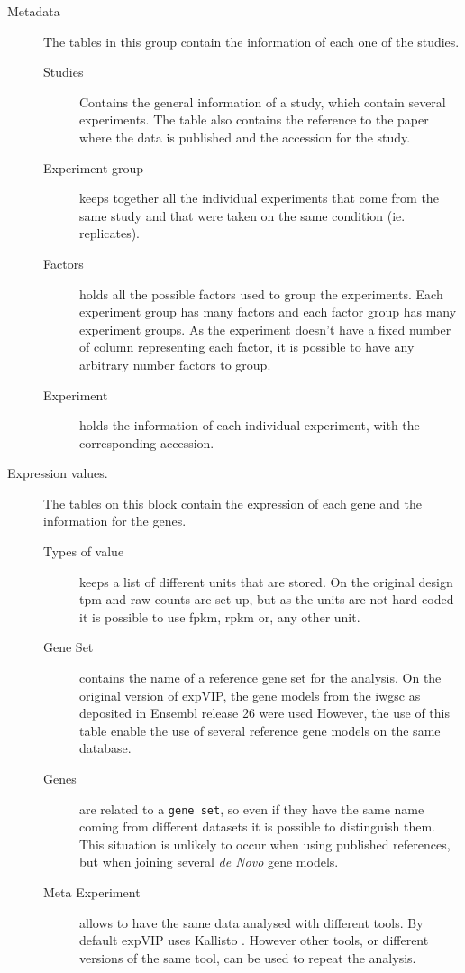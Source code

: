 \begin{description}
\item[Metadata] The tables in this group contain the information of each one of the studies. 
\begin{description}
\item[Studies] Contains the general information of a study, which contain several experiments. The table also contains the reference to the paper where the data is published and the accession for the study. 
\item[Experiment group] keeps together all the individual experiments that come from the same study and that were taken on the same condition (ie. replicates). 
\item[Factors] holds all the possible factors used to group the experiments. Each experiment group has many factors and each factor group has many experiment groups. As the experiment doesn't have a fixed number of column representing each factor, it is possible to have any arbitrary number factors to group. 
\item[Experiment] holds the information of each individual experiment, with the corresponding accession. 
\end{description}
\item[Expression values.] The tables on this block contain the expression of each gene and the information for the genes. 
\begin{description}
\item[Types of value] keeps a list of different units that are stored. On the original design \acrshort{tpm} and raw counts are set up, but as the units are not hard coded it is possible to use \acrshort{fpkm}, \acrshort{rpkm} or, any other unit. 
\item[Gene Set] contains the name of a reference gene set for the analysis. On the original version of expVIP, the gene models from the \acrshort{iwgsc} as deposited in Ensembl release 26 were used \citep{Mayer2014} However, the use of this table enable the use of several reference gene models on the same database. 
\item[Genes] are related to a \texttt{gene set}, so even if they have the same name coming from different datasets it is possible to distinguish them. This situation is unlikely to occur when using published references, but when joining several \textit{de Novo} gene models. 
\item[Meta Experiment] allows to have the same data analysed with different tools. By default expVIP uses Kallisto \citep{Bray2016}. However other tools, or different versions of the same tool, can be used to repeat the analysis.   

\end{description}
\end{description}
